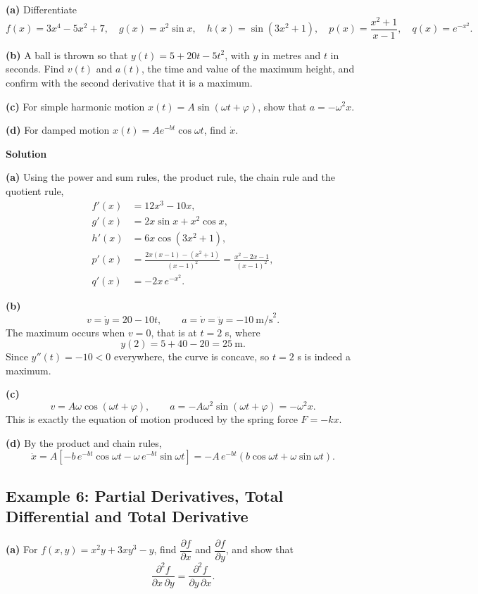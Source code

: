 \documentclass[../main.tex]{subfiles}
\begin{document}
\textbf{(a)} Differentiate
\[
f(x)=3x^4-5x^2+7,
\quad
g(x)=x^2\sin x,
\quad
h(x)=\sin(3x^2+1),
\quad
p(x)=\frac{x^2+1}{x-1},
\quad
q(x)=e^{-x^2}.
\]

\textbf{(b)} A ball is thrown so that $y(t) = 5+20t-5t^2$, with $y$ in metres and $t$ in seconds. Find $v(t)$ and $a(t)$, the time and value of the maximum height, and confirm with the second derivative that it is a maximum.

\textbf{(c)} For simple harmonic motion $x(t) = A\sin(\omega t+\varphi)$, show that $a = -\omega^2 x$.

\textbf{(d)} For damped motion $x(t) = Ae^{-bt}\cos\omega t$, find $\dot{x}$.

\bigskip
\textbf{Solution}

\textbf{(a)} Using the power and sum rules, the product rule, the chain rule and the quotient rule,
\begin{align*}
f'(x) &= 12x^3-10x, \\
g'(x) &= 2x\sin x + x^2\cos x, \\
h'(x) &= 6x\cos(3x^2+1), \\
p'(x) &= \frac{2x(x-1)-(x^2+1)}{(x-1)^2} = \frac{x^2-2x-1}{(x-1)^2}, \\
q'(x) &= -2x\,e^{-x^2}.
\end{align*}

\textbf{(b)}
\[
v = \dot{y} = 20-10t,
\qquad
a = \dot{v} = \ddot{y} = -10\ \text{m/s}^2 .
\]
The maximum occurs when $v = 0$, that is at $t = 2$ s, where
\[
y(2) = 5+40-20 = 25\ \text{m}.
\]
Since $y''(t) = -10 < 0$ everywhere, the curve is concave, so $t = 2$ s is indeed a maximum.

\textbf{(c)}
\[
v = A\omega\cos(\omega t+\varphi),
\qquad
a = -A\omega^2\sin(\omega t+\varphi) = -\omega^2 x .
\]
This is exactly the equation of motion produced by the spring force $F = -kx$.

\textbf{(d)} By the product and chain rules,
\[
\dot{x} = A\left[-b\,e^{-bt}\cos\omega t - \omega\,e^{-bt}\sin\omega t\right]
= -A\,e^{-bt}\left(b\cos\omega t + \omega\sin\omega t\right).
\]


\subsection{Example 6: Partial Derivatives, Total Differential and Total Derivative}

\textbf{(a)} For $f(x,y) = x^2y+3xy^3-y$, find $\dfrac{\partial f}{\partial x}$ and $\dfrac{\partial f}{\partial y}$, and show that
\[
\frac{\partial^2 f}{\partial x\,\partial y} = \frac{\partial^2 f}{\partial y\,\partial x}.
\]
\end{document}
